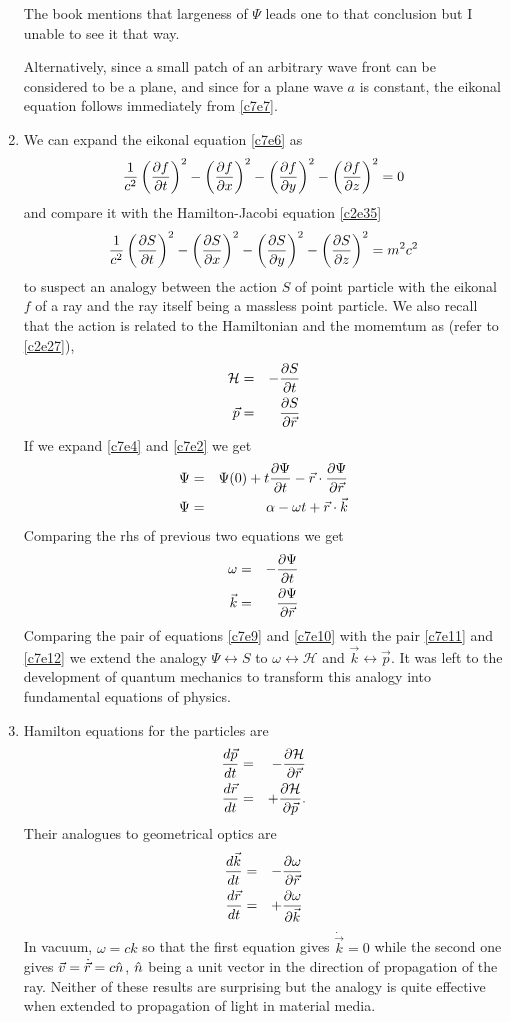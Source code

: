 \begin{enumerate}
The book mentions that largeness of $\Psi$ leads one to that conclusion but I 
unable to see it that way.

Alternatively, since a small patch of an arbitrary wave front can be considered
to be a plane, and since for a plane wave $a$ is constant, the eikonal equation
follows immediately from \eqref{c7e7}.

\item We can expand the eikonal equation \eqref{c7e6} as
\[
\frac{1}{c^2}\left(\frac{\partial{f}}{\partial{t}}\right)^2 - \left(\frac{\partial{f}}{\partial{x}}\right)^2 - 
\left(\frac{\partial{f}}{\partial{y}}\right)^2 - \left(\frac{\partial{f}}{\partial{z}}\right)^2 = 0
\]
and compare it with the Hamilton-Jacobi equation \eqref{c2e35}
\[
\frac{1}{c^2}\left(\frac{\partial{S}}{\partial{t}}\right)^2 - \left(\frac{\partial{S}}{\partial{x}}\right)^2 
- \left(\frac{\partial{S}}{\partial{y}}\right)^2 - \left(\frac{\partial{S}}{\partial{z}}\right)^2 = m^2c^2
\]
to suspect an analogy between the action $S$ of point particle with the eikonal
$f$ of a ray and the ray itself being a massless point particle. We also recall
that the action is related to the Hamiltonian and the momemtum as (refer to
\eqref{c2e27}),
\begin{eqnarray}
\mathcal{H} &=& -\frac{\partial{S}}{\partial{t}} \label{c7e9} \\
\vec{p} &=& \frac{\partial{S}}{\partial{\vec{r}}} \label{c7e10}
\end{eqnarray}
If we expand \eqref{c7e4} and \eqref{c7e2} we get
\begin{eqnarray*}
\Psi &=& \Psi(0) + t\frac{\partial{\Psi}}{\partial{t}} - \vec{r}\cdot\frac{\partial{\Psi}}{\partial{\vec{r}}} \\
\Psi &=& \alpha - \omega t + \vec{r}\cdot\vec{k}
\end{eqnarray*}
Comparing the rhs of previous two equations we get
\begin{eqnarray}
\omega &=& -\frac{\partial{\Psi}}{\partial{t}} \label{c7e11} \\
\vec{k} &=& \frac{\partial{\Psi}}{\partial{\vec{r}}} \label{c7e12}
\end{eqnarray}
Comparing the pair of equations \eqref{c7e9} and \eqref{c7e10} with the pair
\eqref{c7e11} and \eqref{c7e12} we extend the analogy $\Psi \leftrightarrow S$
to $\omega \leftrightarrow \mathcal{H}$ and $\vec{k} \leftrightarrow \vec{p}$.
It was left to the development of quantum mechanics to transform this analogy
into fundamental equations of physics.

\item Hamilton equations for the particles are
\begin{eqnarray*}
\frac{d{\vec{p}}}{d{t}} &=& -\frac{\partial{\mathcal{H}}}{\partial{\vec{r}}} \\
\frac{d{\vec{r}}}{d{t}} &=& +\frac{\partial{\mathcal{H}}}{\partial{\vec{p}}}.
\end{eqnarray*}
Their analogues to geometrical optics are
\begin{eqnarray}
\frac{d{\vec{k}}}{d{t}} &=& -\frac{\partial{\omega}}{\partial{\vec{r}}} \label{c7e13} \\
\frac{d{\vec{r}}}{d{t}} &=& +\frac{\partial{\omega}}{\partial{\vec{k}}} \label{c7e14}
\end{eqnarray}
In vacuum, $\omega = ck$ so that the first equation gives $\dot{\vec{k}} = 0$ 
while the second one gives $\vec{v} = \dot{\vec{r}} = c\hat{n}$, $\hat{n}$ being a unit
vector in the direction of propagation of the ray. Neither of these results are 
surprising but the analogy is quite effective when extended to propagation of 
light in material media.


\end{enumerate}
